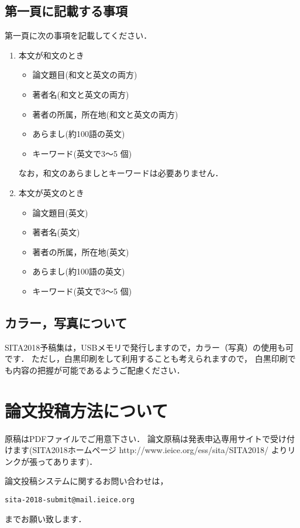 \documentclass{jarticle}
\begin{document}
\subsection{第一頁に記載する事項}

第一頁に次の事項を記載してください．

\begin{enumerate}
 \item 本文が和文のとき
       \begin{itemize}
	\item 論文題目(和文と英文の両方)
	\item 著者名(和文と英文の両方)
	\item 著者の所属，所在地(和文と英文の両方)
	\item あらまし(約100語の英文)
	\item キーワード(英文で3～5 個)
       \end{itemize}
       なお，和文のあらましとキーワードは必要ありません．
 \item 本文が英文のとき
       \begin{itemize}
	\item 論文題目(英文)
	\item 著者名(英文)
	\item 著者の所属，所在地(英文)
	\item あらまし(約100語の英文)
	\item キーワード(英文で3～5 個)
       \end{itemize}
\end{enumerate}


\subsection{カラー，写真について}

SITA2018予稿集は，USBメモリで発行しますので，カラー（写真）の使用も可です．
ただし，白黒印刷をして利用することも考えられますので，
白黒印刷でも内容の把握が可能であるようご配慮ください．


\section{論文投稿方法について}

原稿はPDFファイルでご用意下さい．
論文原稿は発表申込専用サイトで受け付けます(SITA2018ホームページ
http://www.ieice.org/ess/sita/SITA2018/
よりリンクが張ってあります)．

論文投稿システムに関するお問い合わせは，
\begin{center}
\tt sita-2018-submit@mail.ieice.org
\end{center}
までお願い致します．
\end{document}
